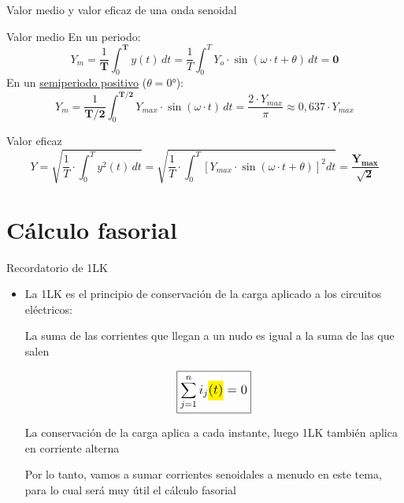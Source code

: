 \documentclass[aspectratio=169, usenames,svgnames,dvipsnames]{beamer}
\begin{document}

\begin{frame}{Valor medio y valor eficaz de una onda senoidal}
    \begin{block}{Valor medio}
        En un periodo: \[
        Y_m=\frac{1}{\boldsymbol{T}}\int_{0}^{\boldsymbol{T}}y(t)\, dt =\frac{1}{T}\int_{0}^{T}Y_{o}\cdot\sin(\omega \cdot t +\theta)\, dt = \boxed{\boldsymbol{0}}
        \]
        En un \href{https://raw.githubusercontent.com/ETSIDI-IE/tc/master/docs/ejercicios_clase/TC1_02_Ym_semiperiodo_senoidal_LBB.pdf}{semiperiodo positivo} ($\theta = \ang{0}$): \[
        Y_m=\frac{1}{\boldsymbol{T/2}}\int_{0}^{\boldsymbol{T/2}}Y_{max}\cdot\sin(\omega \cdot t)\, dt = \dfrac{2\cdot Y_{max}}{\pi}\approx 0,637\cdot Y_{max}
        \]
    \end{block}
    
    \begin{block}{Valor eficaz}
        \[
        Y = \sqrt{\frac{1}{T}\cdot\int_{0}^{T}y^{2}(t)\, dt} 
        =\sqrt{\frac{1}{T}\cdot\int_{0}^{T}\left[Y_{max}\cdot\sin(\omega\cdot t+\theta)\right]^{2}dt}=\boxed{\boldsymbol{\frac{Y_{max}}{\sqrt{2}}}}
        \]
    \end{block}
\end{frame}


\section{Cálculo fasorial}

\begin{frame}{Recordatorio de 1LK}
    \begin{itemize}
        \item La \alert{1LK} es el principio de \alert{conservación de la carga} aplicado a los circuitos eléctricos:
        
        \vspace{5mm}
        
        La suma de las corrientes que llegan a un nudo es igual a la suma de las que salen   

        \vspace{2mm}
        \begin{equation*}
            \large{\boxed{ \sum_{j=1}^n i_j\colorbox{yellow}{\hspace{-1mm}$(t)$\hspace{-1mm}} = 0}}
        \end{equation*}

        \vspace{2mm}
        La conservación de la carga \alert{aplica a cada instante}, luego 1LK también \alert{aplica en corriente alterna}

        \vspace{5mm}
        Por lo tanto, vamos a sumar corrientes senoidales a menudo en este tema, para lo cual será muy útil el \alert{cálculo fasorial}
        
    \end{itemize}    
\end{frame}
\end{document}
